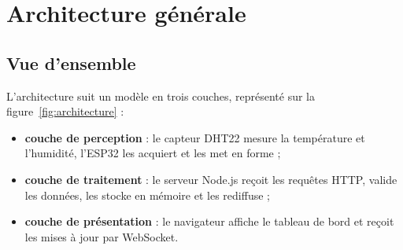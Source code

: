 \documentclass[11pt,a4paper]{article}
\begin{document}
\section{Architecture générale}

\subsection{Vue d'ensemble}

L'architecture suit un modèle en trois couches, représenté sur la figure~\ref{fig:architecture} :

\begin{itemize}
  \item \textbf{couche de perception} : le capteur DHT22 mesure la température et l'humidité,
        l'ESP32 les acquiert et les met en forme ;
  \item \textbf{couche de traitement} : le serveur Node.js reçoit les requêtes HTTP, valide
        les données, les stocke en mémoire et les rediffuse ;
  \item \textbf{couche de présentation} : le navigateur affiche le tableau de bord et reçoit
        les mises à jour par WebSocket.
\end{itemize}
\end{document}
